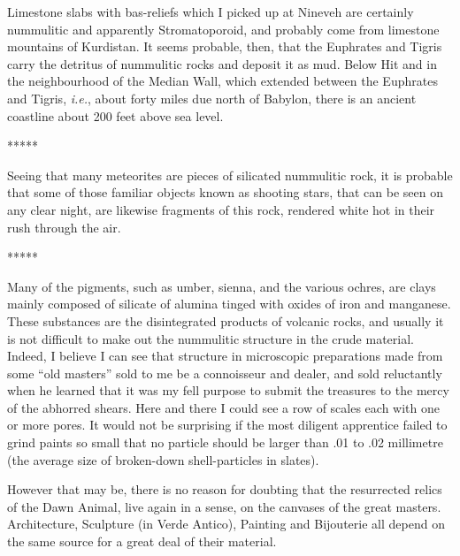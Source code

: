 \documentclass[a4paper, 12pt, oneside]{article}
\begin{document}
Limestone slabs with bas-reliefs which I picked up at Nineveh are certainly nummulitic and apparently Stromatoporoid, and probably come from limestone mountains of Kurdistan. It seems probable, then, that the Euphrates and Tigris carry the detritus of nummulitic rocks and deposit it as mud. Below Hit and in the neighbourhood of the Median Wall, which extended between the Euphrates and Tigris, \emph{i.e.}, about forty miles due north of Babylon, there is an ancient coastline about 200 feet above sea level.

\centerline{*\hspace{15mm}*\hspace{15mm}*\hspace{15mm}*\hspace{15mm}*}
\bigskip

Seeing that many meteorites are pieces of silicated nummulitic rock, it is probable that some of those familiar objects known as shooting stars, that can be seen on any clear night, are likewise fragments of this rock, rendered white hot in their rush through the air.

\centerline{*\hspace{15mm}*\hspace{15mm}*\hspace{15mm}*\hspace{15mm}*}
\bigskip

Many of the pigments, such as umber, sienna, and the various ochres, are clays mainly composed of silicate of alumina tinged with oxides of iron and manganese. These substances are the disintegrated products of volcanic rocks, and usually it is not difficult to make out the nummulitic structure in the crude material. Indeed, I believe I can see that structure in microscopic preparations made from some ``old masters'' sold to me be a connoisseur and dealer, and sold reluctantly when he learned that it was my fell purpose to submit the treasures to the mercy of the abhorred shears. Here and there I could see a row of scales each with one or more pores. It would not be surprising if the most diligent apprentice failed to grind paints so small that no particle should be larger than .01 to .02 millimetre (the average size of broken-down shell-particles in slates).

However that may be, there is no reason for doubting that the resurrected relics of the Dawn Animal, live again in a sense, on the canvases of the great masters. Architecture, Sculpture (in Verde Antico), Painting and Bijouterie all depend on the same source for a great deal of their material.
\end{document}
